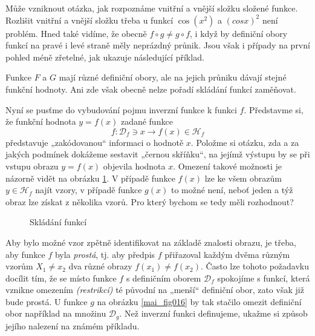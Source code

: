 {      Může vzniknout otázka, jak rozpoznáme vnitřní a vnější složku složené funkce. Rozlišit 
      vnitřní a vnější složku třeba u funkcí \(\cos(x^2)\) a \((cos x)^2\) není problém. Hned také 
      vidíme, že obecně \(f\circ g\neq g\circ f\), i když by definiční obory funkcí na pravé i levé 
      straně měly neprázdný průnik. Jsou však i případy na první pohled méně zřetelné, jak ukazuje 
      následující příklad.
      
        
       
      Funkce \(F\) a \(G\) mají různé definiční obory, ale na jejich průniku dávají stejné funkční 
      hodnoty. Ani zde však obecně nelze pořadí skládání funkcí zaměňovat.
      
      Nyní se pusťme do vybudování pojmu inverzní funkce k funkci \(f\). Představme si, že funkční
      hodnota \(y = f(x)\) zadané funkce
      \begin{equation*}
        f: \mathcal{D}_f\ni x \rightarrow f(x)\in\mathcal{H}_f
      \end{equation*}
      představuje „zakódovanou“ informaci o hodnotě \(x\). Položme si otázku, zda a za jakých 
      podmínek dokážeme sestavit „černou skříňku“, na jejímž výstupu by se při vstupu obrazu \(y = 
      f(x)\) objevila hodnota \(x\). Omezení takové možnosti je názorně vidět na obrázku 
      \ref{mai_fig014}. V případě funkce \(f(x)\) lze ke všem obrazům \(y \in \mathcal{H}_f\) najít 
      vzory, v případě funkce \(g(x)\) to možné není, neboť jeden a týž obraz lze získat z několika 
      vzorů. Pro který bychom se tedy měli rozhodnout?
      
      \begin{figure}[ht!] %
        \centering
        
        \caption{Skládání funkcí \cite[s.~61]{Musilova2009MA1}}
        \label{mai_fig014}
      \end{figure}
       Aby bylo možné vzor zpětně identifikovat na základě znalosti obrazu, je třeba, aby funkce 
       \(f\) byla \emph{prostá}, tj. aby předpis \(f\) přiřazoval každým dvěma různým vzorům \(X_1 
       \neq x_2\) dva různé obrazy \(f(x_1) \neq f(x_2)\). Často lze tohoto požadavku docílit tím, 
       že se místo funkce \(f\) s definičním oborem \(\mathcal{D}_f\) spokojíme s funkcí, která 
       vznikne omezením \emph{(restrikcí)} té původní na „menší“ definiční obor, zato však již bude 
       prostá. U funkce \(g\) na obrázku \ref{mai_fig016} by tak stačilo omezit definiční obor 
       například na množinu \(\mathcal{D}_g\). Než inverzní funkci definujeme, ukažme si způsob 
       jejího nalezení na známém příkladu.

}
